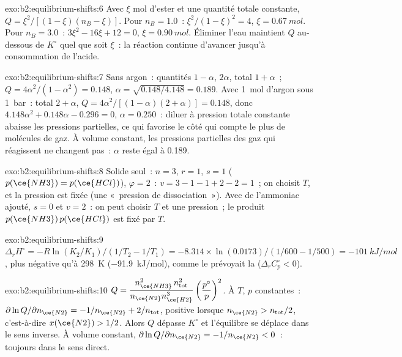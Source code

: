 \begin{solution}{exo:b2:equilibrium-shifts:6}
Avec $\xi$ mol d'ester et une quantité totale constante, $Q =
\xi^2/[(1 - \xi)(n_B - \xi)]$. Pour $n_B = 1.0$~: $\xi^2/(1 - \xi)^2 = 4$, $\xi
= \qty{0.67}{mol}$. Pour $n_B = 3.0$~: $3\xi^2 - 16\xi + 12 = 0$, $\xi =
\qty{0.90}{mol}$. Éliminer l'eau maintient $Q$ au-dessous de $K^\circ$ quel que soit $\xi$~: la
réaction continue d'avancer jusqu'à consommation de l'acide.
\end{solution}

\begin{solution}{exo:b2:equilibrium-shifts:7}
Sans argon~: quantités $1 - \alpha$, $2\alpha$, total $1 + \alpha$~;
$Q = 4\alpha^2/(1 - \alpha^2) = 0.148$, $\alpha = \sqrt{0.148/4.148} = 0.189$.
Avec \qty{1}{mol} d'argon sous \qty{1}{bar}~: total $2 + \alpha$, $Q =
4\alpha^2/[(1 - \alpha)(2 + \alpha)] = 0.148$, donc $4.148\alpha^2 + 0.148\alpha
- 0.296 = 0$, $\alpha = 0.250$~: diluer à pression totale constante abaisse les
pressions partielles, ce qui favorise le côté qui compte le plus de molécules de gaz. À
volume constant, les pressions partielles des gaz qui réagissent ne changent pas~:
$\alpha$ reste égal à 0.189.
\end{solution}

\begin{solution}{exo:b2:equilibrium-shifts:8}
Solide seul~: $n = 3$, $r = 1$, $s = 1$ ($p(\ce{NH3}) = p(\ce{HCl})$),
$\varphi = 2$~: $v = 3 - 1 - 1 + 2 - 2 = 1$~; on choisit $T$, et la pression est
fixée (une «~pression de dissociation~»). Avec de l'ammoniac ajouté, $s = 0$ et $v = 2$~:
on peut choisir $T$ et une pression~; le produit $p(\ce{NH3})\,p(\ce{HCl})$ est
fixé par $T$.
\end{solution}

\begin{solution}{exo:b2:equilibrium-shifts:9}
$\Delta_r H^\circ = -R\ln(K_2/K_1)/(1/T_2 - 1/T_1) = -8.314 \times
\ln(0.0173)/(1/600 - 1/500) = \qty{-101}{kJ/mol}$, plus négative qu'à
\qty{298}{K} (\qty{-91.9}{kJ/mol}), comme le prévoyait la 
($\Delta_r C_p^\circ < 0$).
\end{solution}

\begin{solution}{exo:b2:equilibrium-shifts:10}
$Q = \dfrac{n_{\ce{NH3}}^2\,n_{\text{tot}}^2}{n_{\ce{N2}}n_{\ce{H2}}^3}
\left(\dfrac{p^\circ}{p}\right)^2$. À $T$, $p$ constantes~:
$\partial\ln Q/\partial n_{\ce{N2}} = -1/n_{\ce{N2}} + 2/n_{\text{tot}}$, positive
lorsque $n_{\ce{N2}} > n_{\text{tot}}/2$, c'est-à-dire $x(\ce{N2}) > 1/2$. Alors $Q$
dépasse $K^\circ$ et l'équilibre se déplace dans le sens inverse. À volume constant,
$\partial\ln Q/\partial n_{\ce{N2}} = -1/n_{\ce{N2}} < 0$~: toujours dans le sens direct.
\end{solution}

